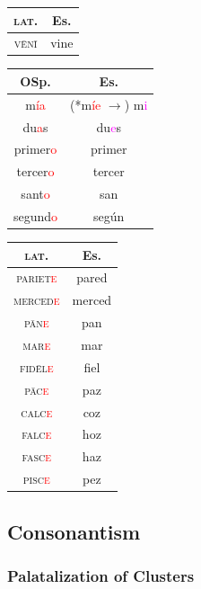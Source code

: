\documentclass{report}[12pt]
\begin{document}
\begin{tabular}{c c}
  \textsc{lat.} & Es. \\
  \hline
  \textsc{v\={e}n\={i}} & vine \\  
\end{tabular}

\begin{tabular}{c c}
  OSp. & Es. \\
  \hline
  m\textcolor{red}{ía} & (*m\textcolor{red}{íe} $\rightarrow$) m\textcolor{magenta}{i} \\
  du\textcolor{red}{a}s & du\textcolor{magenta}{e}s \\
  primer\textcolor{red}{o} & primer \\
  tercer\textcolor{red}{o} & tercer \\
  sant\textcolor{red}{o} & san \\
  segund\textcolor{red}{o} & según \\
\end{tabular}

\begin{tabular}{c c}
  \textsc{lat.} & Es. \\
  \hline
  \textsc{pariet\textcolor{red}{e}} & pared \\
  \textsc{merced\textcolor{red}{e}} & merced \\
  \textsc{p\={a}n\textcolor{red}{e}} & pan \\
  \textsc{mar\textcolor{red}{e}} & mar \\
  \textsc{fid\={e}l\textcolor{red}{e}} & fiel \\
  \textsc{p\={a}c\textcolor{red}{e}} & paz \\
  \textsc{calc\textcolor{red}{e}} & coz \\
  \textsc{falc\textcolor{red}{e}} & hoz \\
  \textsc{fasc\textcolor{red}{e}} & haz \\
  \textsc{pisc\textcolor{red}{e}} & pez \\
\end{tabular}

\subsection{Consonantism}

\subsubsection*{Palatalization of Clusters}
\end{document}
